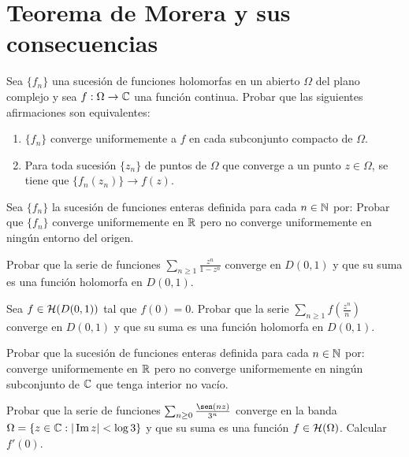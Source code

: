 \section{Teorema de Morera y sus consecuencias}

\begin{ejercicio}
    Sea $\{f_n\}$ una sucesión de funciones holomorfas en un abierto $\Omega$ del plano complejo y sea $f:\Omega\to\mathbb{C}$ una función continua. Probar que las siguientes afirmaciones son equivalentes:
    \begin{enumerate}
        \item $\{f_n\}$ converge uniformemente a $f$ en cada subconjunto compacto de $\Omega$.
        \item Para toda sucesión $\{z_n\}$ de puntos de $\Omega$ que converge a un punto $z\in\Omega$, se tiene que $\{f_n(z_n)\}\to f(z)$.
    \end{enumerate}
\end{ejercicio}

\begin{ejercicio}
    Sea $\{f_n\}$ la sucesión de funciones enteras definida para cada $n\in\mathbb{N}$ por:
    Probar que $\{f_n\}$ converge uniformemente en $\mathbb{R}$ pero no converge uniformemente en ningún entorno del origen.
\end{ejercicio}

\begin{ejercicio}
    Probar que la serie de funciones $\sum\limits_{n\geq 1} \frac{z^n}{1-z^n}$ converge en $D(0,1)$ y que su suma es una función holomorfa en $D(0,1)$.
\end{ejercicio}

\begin{ejercicio}
    Sea $f\in \mathcal{H}(D(0,1))$ tal que $f(0)=0$. Probar que la serie $\sum\limits_{n\geq 1} f\left(\frac{z^n}{n}\right)$ converge en $D(0,1)$ y que su suma es una función holomorfa en $D(0,1)$.
\end{ejercicio}

\begin{ejercicio}
    Probar que la sucesión de funciones enteras definida para cada $n\in\mathbb{N}$ por:
    converge uniformemente en $\mathbb{R}$ pero no converge uniformemente en ningún subconjunto de $\mathbb{C}$ que tenga interior no vacío.
\end{ejercicio}

\begin{ejercicio}
    Probar que la serie de funciones $\sum_{n\geq 0} \frac{\sen(nz)}{3^n}$ converge en la banda $\Omega = \{z\in\mathbb{C} : |\operatorname{Im} z| < \log 3\}$ y que su suma es una función $f\in \mathcal{H}(\Omega)$. Calcular $f'(0)$.
\end{ejercicio}

